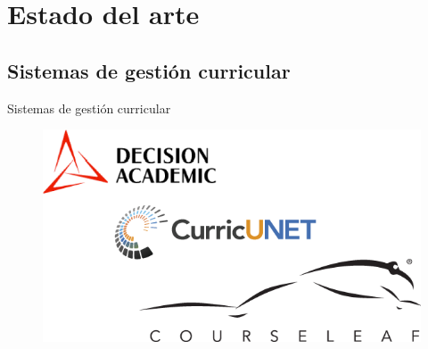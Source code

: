 \documentclass[10pt,xcolor=table ]{beamer}
\begin{document}
\section{Estado del arte}
\subsection{Sistemas de gestión curricular}
\begin{frame}{Sistemas de gestión curricular}
	\begin{figure}
		\centering
	    \includegraphics[scale=0.5]{../Figuras/cms_alternatives}
	\end{figure}
\end{frame}
\end{document}
